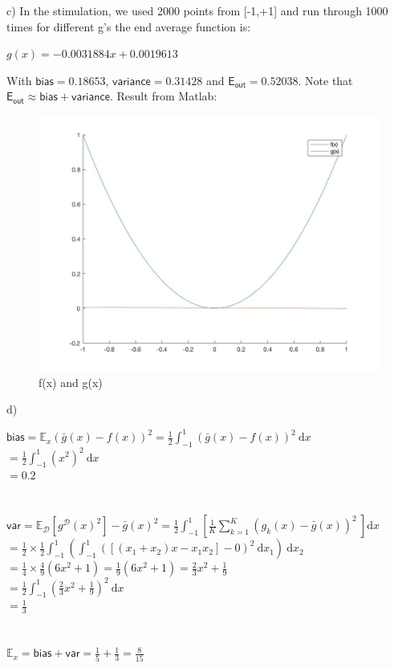\documentclass[12pt]{article}
\begin{document}
\indent c) In the stimulation, we used 2000 points from [-1,+1] and run through 1000 times for different g's the end average function is: \begin{center} $g(x) = -0.0031884x + 0.0019613$\end{center} With $\mathsf{bias} = 0.18653$, $\mathsf{variance} = 0.31428$ and $\mathsf{E_{out}} = 0.52038$. Note that $\mathsf{E_{out}} \approx \mathsf{bias}+\mathsf{variance}$. Result from Matlab:\begin{figure}[H]
  \centering
  \includegraphics[scale = 0.35]{Pic2.jpg}
  \caption{f(x) and g(x)}
  \label{fig:Pic2}
\end{figure}
\indent \indent d) \begin{center} 
$\displaystyle \mathsf{bias} = \mathbb{E}_x( \bar{g}(x)-f(x) )^2 = \frac{1}{2}\int_{-1}^{1}( \bar{g}(x)-f(x) )^2\ \mathrm{d}x$\\
$\displaystyle = \frac{1}{2} \int_{-1}^{1}(x^2)^2\ \mathrm{d}x$\\
$\displaystyle =0.2$\\ \indent \\\indent \\
$\displaystyle \mathsf{var} = \mathbb{E}_{\mathcal{D}}[ g^{\mathcal{D}}(x)^2] - \bar{g}(x)^2= \frac{1}{2}\int_{-1}^{1}\left[ \frac{1}{K}\sum_{k = 1}^K (g_k(x)-\bar{g}(x))^2\ \right]\mathrm{d}x$\\
$\displaystyle = \frac{1}{2}\times\frac{1}{2}\int_{-1}^{1}\left(\int_{-1}^{1}(\left[(x_1+x_2)x-x_1x_2\right]-0)^2\ \mathrm{d}x_1\right)\ \mathrm{d}x_2$\\
$\displaystyle = \frac{1}{4}\times\frac{4}{9}(6x^2+1) = \frac{1}{9}(6x^2+1) = \frac{2}{3} x^2 + \frac{1}{9}$\\
$\displaystyle = \frac{1}{2} \int_{-1}^{1}(\frac{2}{3}x^2+\frac{1}{9})^2\ \mathrm{d}x$\\
$\displaystyle = \frac{1}{3}$\\ \indent \\\indent \\
$\displaystyle \mathbb{E}_{x} =  \mathsf{bias} + \mathsf{var} = \frac{1}{5} + \frac{1}{3} = \frac{8}{15}$

\end{center}
\end{document}
